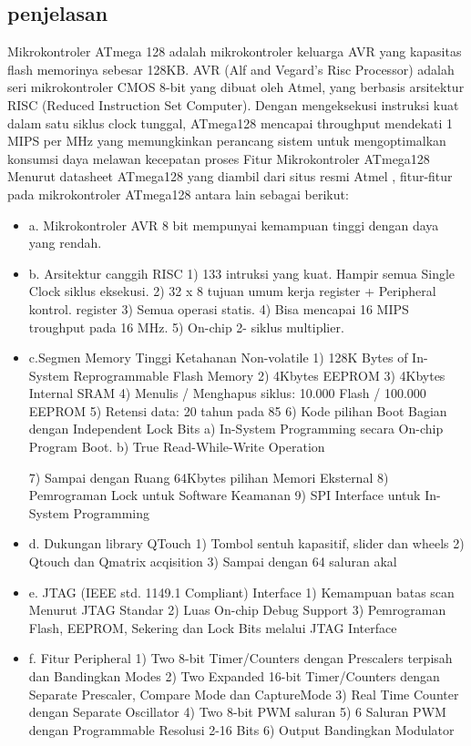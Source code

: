 	\subsection{penjelasan}
	Mikrokontroler ATmega 128 adalah mikrokontroler keluarga AVR yang kapasitas flash memorinya sebesar 128KB. AVR (Alf and Vegard’s Risc Processor) adalah seri mikrokontroler CMOS 8-bit yang dibuat oleh Atmel, yang berbasis arsitektur RISC (Reduced Instruction Set Computer). Dengan mengeksekusi instruksi kuat dalam satu siklus clock tunggal, ATmega128 mencapai throughput mendekati 1 MIPS per MHz yang memungkinkan perancang sistem untuk mengoptimalkan konsumsi daya melawan kecepatan proses
	Fitur Mikrokontroler ATmega128
	Menurut datasheet ATmega128 yang diambil dari situs resmi Atmel , fitur-fitur pada mikrokontroler ATmega128 antara lain sebagai berikut:
	\begin{itemize}
		\item a. Mikrokontroler AVR 8 bit mempunyai kemampuan tinggi dengan daya yang rendah. 
		\item b. Arsitektur canggih RISC
				1) 133 intruksi yang kuat. Hampir semua Single Clock siklus eksekusi.
				2) 32 x 8 tujuan umum kerja register + Peripheral kontrol. register 
				3) Semua operasi statis.
				4) Bisa mencapai 16 MIPS troughput pada 16 MHz.
				5) On-chip 2- siklus multiplier.
		\item c.Segmen Memory Tinggi Ketahanan Non-volatile 
				1) 128K Bytes of In-System Reprogrammable Flash Memory
				2) 4Kbytes EEPROM
				3) 4Kbytes Internal SRAM
				4) Menulis / Menghapus siklus: 10.000 Flash / 100.000 EEPROM 
				5) Retensi data: 20 tahun pada 85 
				6) Kode pilihan Boot Bagian dengan Independent Lock Bits 
					a) In-System Programming secara On-chip Program Boot. 
					b) True Read-While-Write Operation 
					
				7) Sampai dengan Ruang 64Kbytes pilihan Memori Eksternal
				8) Pemrograman Lock untuk Software Keamanan
				9) SPI Interface untuk In-System Programming
		\item d. Dukungan library QTouch
				1) Tombol sentuh kapasitif, slider dan wheels 
				2) Qtouch dan Qmatrix acqisition 
				3) Sampai dengan 64 saluran akal 
		\item e. JTAG (IEEE std. 1149.1 Compliant) Interface
				1) Kemampuan batas scan Menurut JTAG Standar
				2) Luas On-chip Debug Support 3) Pemrograman Flash, EEPROM, Sekering dan Lock Bits melalui  JTAG Interface
		\item f. Fitur Peripheral 
				1) Two 8-bit Timer/Counters dengan Prescalers terpisah dan Bandingkan Modes 
				2) Two Expanded 16-bit Timer/Counters dengan Separate Prescaler, Compare Mode dan CaptureMode 
				3) Real Time Counter dengan Separate Oscillator
				4) Two 8-bit PWM saluran 
				5) 6 Saluran PWM dengan Programmable Resolusi 2-16 Bits 
				6) Output Bandingkan Modulator

		\end{itemize}
		
	\cite{kioumars2011atmega}
	\cite{stankovic2008wireless}

	